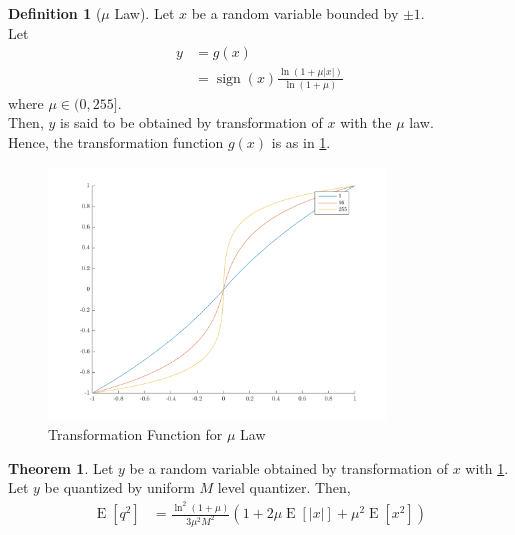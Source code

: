 \documentclass[titlepage, fleqn, a4paper, 12pt, twoside]{article}
\theoremstyle{definition}
\newtheorem{definition}{Definition}
\theoremstyle{theorem}
\newtheorem{theorem}{Theorem}
\DeclareMathOperator{\expct}{\mathrm{E}}
\DeclareMathOperator{\sign}{\mathrm{sign}}
\begin{document}
\begin{definition}[$\mu$ Law]
	Let $x$ be a random variable bounded by $\pm 1$.\\
	Let
	\begin{align*}
		y &= g(x)\\
		&= \sign(x) \frac{\ln\left( 1 + \mu |x| \right)}{\ln(1 + \mu)}
	\end{align*}
	where $\mu \in (0,255]$.\\
	Then, $y$ is said to be obtained by transformation of $x$ with the $\mu$ law.\\
	Hence, the transformation function $g(x)$ is as in \cref{fig:transformation_function_for_mu_law}.
	\begin{figure}[H]
		\centering
		\includegraphics[width = 0.8\textwidth]{./Plots/mu_law.pdf}
		\caption{Transformation Function for $\mu$ Law}
		\label{fig:transformation_function_for_mu_law}
	\end{figure}
	\label{def:mu_law}
\end{definition}

\begin{theorem}
	Let $y$ be a random variable obtained by transformation of $x$ with \cref{def:mu_law}.\\
	Let $y$ be quantized by uniform $M$ level quantizer.
	Then,
	\begin{align*}
		\expct\left[ q^2 \right] &= \frac{\ln^2(1 + \mu)}{3 \mu^2 M^2} \left( 1 + 2 \mu \expct\left[ |x| \right] + \mu^2 \expct\left[ x^2 \right] \right)
	\end{align*}
\end{theorem}
\end{document}
